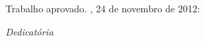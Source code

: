 \documentclass[
	12pt,				%
	openright,			%
	oneside,			%
	a4paper,			%
	english,			%
	french,				%
	spanish,			%
	brazil				%
	]{abntex2}
\begin{document}
%
% 
%
\begin{folhadeaprovacao}

  \begin{center}
    {\ABNTEXchapterfont\large\imprimirautor}

    \vspace*{\fill}\vspace*{\fill}
    \begin{center}
      \ABNTEXchapterfont\bfseries\Large\imprimirtitulo
    \end{center}
    \vspace*{\fill}
    
    \hspace{.45\textwidth}
    \begin{minipage}{.5\textwidth}
        \imprimirpreambulo
    \end{minipage}%
    \vspace*{\fill}
   \end{center}
        
   Trabalho aprovado. \imprimirlocal, 24 de novembro de 2012:

      
   \begin{center}
    \vspace*{0.5cm}
    {\large\imprimirlocal}
    \par
    {\large\imprimirdata}
    \vspace*{1cm}
  \end{center}
  
\end{folhadeaprovacao}

\begin{dedicatoria}
   \vspace*{\fill}
   \centering
   \noindent
   \textit{ Dedicatória} \vspace*{\fill}
\end{dedicatoria}
\end{document}
